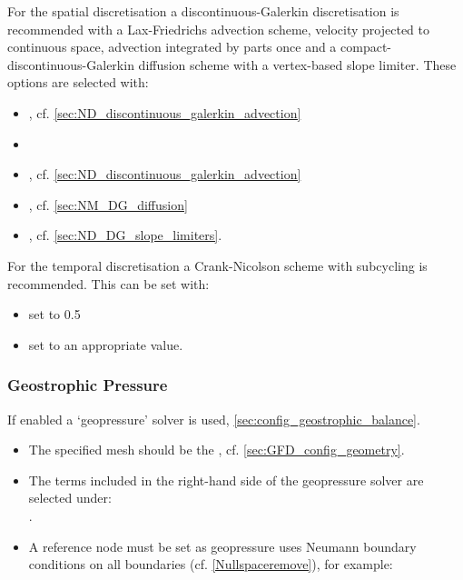 For the spatial discretisation a discontinuous-Galerkin discretisation
is recommended with a Lax-Friedrichs advection scheme, velocity
projected to continuous space, advection integrated by parts once and
a compact-discontinuous-Galerkin diffusion scheme with a vertex-based
slope limiter. These options are selected with:
\begin{itemize}
\item{, cf. \ref{sec:ND_discontinuous_galerkin_advection}}
\item{}
\item{, cf. \ref{sec:ND_discontinuous_galerkin_advection}}
\item{, cf. \ref{sec:NM_DG_diffusion}}
\item{, cf. \ref{sec:ND_DG_slope_limiters}.}
\end{itemize}

For the temporal discretisation a Crank-Nicolson scheme with subcycling is recommended. This can be set with:
\begin{itemize}
\item{ set to 0.5}
\item{ set to an appropriate value.}
\end{itemize}


\subsubsection{Geostrophic Pressure}
\label{sec:GFD_config_geopressure}
If enabled a `geopressure' solver is used, \ref{sec:config_geostrophic_balance}. 
\begin{itemize}
\item The specified mesh should be the , cf. \ref{sec:GFD_config_geometry}. 
\item The terms included in the right-hand side of the geopressure solver are selected under: \\
.
\item A reference node must be set as geopressure uses Neumann boundary conditions on all boundaries (cf. \ref{Nullspaceremove}), for example:
\end{itemize}


